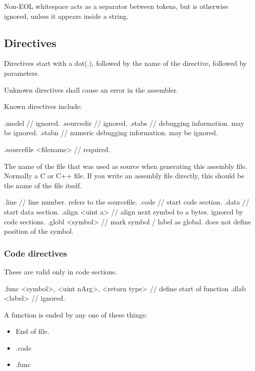 \documentclass {article}
\begin{document}
Non-EOL whitespace acts as a separator between tokens, but is otherwise ignored, unless it appears inside a string.


\subsection{Directives}

Directives start with a dot(.), followed by the name of the directive, followed by parameters.

Unknown directives shall cause an error in the assembler.

Known directives include:

\begin{verbatimtab}
.model	// ignored.
.sourcedir	// ignored.
.stabs	// debugging information. may be ignored.
.stabn // numeric debugging information. may be ignored.
\end{verbatimtab}

\begin{verbatimtab}
.sourcefile <filename>	// required.
\end{verbatimtab}
The name of the file that was used as source when generating this assembly file.
Normally a C or C++ file. If you write an assembly file directly, this should be the name of the file itself.

\begin{verbatimtab}
.line	// line number. refers to the sourcefile.
.code	// start code section.
.data	// start data section.
.align <uint a>	// align next symbol to a bytes. ignored by code sections.
.globl <symbol>	// mark symbol / label as global. does not define position of the symbol.
\end{verbatimtab}


\subsubsection{Code directives}

These are valid only in code sections.

\begin{verbatimtab}
.func <symbol>, <uint nArg>, <return type>	// define start of function
.dlab <label>	// ignored.
\end{verbatimtab}

A function is ended by any one of these things:
\begin{itemize}
	\item End of file.
	\item .code
	\item .func
\end{itemize}
\end{document}
